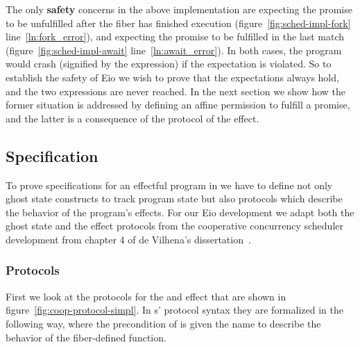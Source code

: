The only \textbf{safety} concerns in the above implementation are  expecting the promise to be unfulfilled after the fiber has finished execution (figure~\ref{fig:sched-impl-fork} line~\ref{ln:fork_error}),
and  expecting the promise to be fulfilled in the last match (figure~\ref{fig:sched-impl-await} line~\ref{ln:await_error}).
In both cases, the program would crash (signified by the  expression) if the expectation is violated.
So to establish the safety of Eio we wish to prove that the expectations always hold, and the two  expressions are never reached.
In the next section we show how the former situation is addressed by defining an affine permission to fulfill a promise, and the latter is a consequence of the protocol of the \esuspend{} effect.

\subsection{Specification}
\label{sec:sched-spec}

To prove specifications for an effectful program in \hazel{} we have to define not only ghost state constructs to track program state but also protocols which describe the behavior of the program's effects.
For our Eio development we adapt both the ghost state and the effect protocols from the cooperative concurrency scheduler development from chapter 4 of de Vilhena's dissertation~\cite{de2022proof}.

\subsubsection{Protocols}
\label{sec:sched-spec-protocols}

First we look at the protocols for the \efork{} and \esuspend{} effect that are shown in figure~\ref{fig:coop-protocol-simpl}.
In \hazel{}s' protocol syntax they are formalized in the following way, where the precondition of \esuspend{} is given the name \gsIsReg{} to describe the behavior of the fiber-defined  function.

